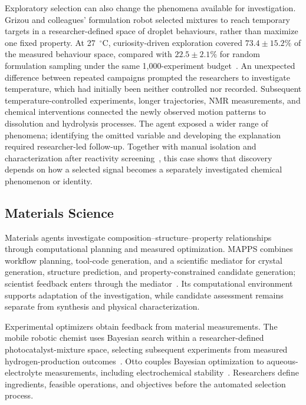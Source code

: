 Exploratory selection can also change the phenomena available for investigation. Grizou and colleagues' formulation robot selected mixtures to reach temporary targets in a researcher-defined space of droplet behaviours, rather than maximize one fixed property. At 27~$^\circ$C, curiosity-driven exploration covered $73.4\pm15.2\%$ of the measured behaviour space, compared with $22.5\pm2.1\%$ for random formulation sampling under the same 1,000-experiment budget~\cite{asd0575}. An unexpected difference between repeated campaigns prompted the researchers to investigate temperature, which had initially been neither controlled nor recorded. Subsequent temperature-controlled experiments, longer trajectories, NMR measurements, and chemical interventions connected the newly observed motion patterns to dissolution and hydrolysis processes. The agent exposed a wider range of phenomena; identifying the omitted variable and developing the explanation required researcher-led follow-up. Together with manual isolation and characterization after reactivity screening~\cite{asd0734}, this case shows that discovery depends on how a selected signal becomes a separately investigated chemical phenomenon or identity.

\subsection{Materials Science}

Materials agents investigate composition--structure--property relationships through computational planning and measured optimization. MAPPS combines workflow planning, tool-code generation, and a scientific mediator for crystal generation, structure prediction, and property-constrained candidate generation; scientist feedback enters through the mediator~\cite{asd0001}. Its computational environment supports adaptation of the investigation, while candidate assessment remains separate from synthesis and physical characterization.

Experimental optimizers obtain feedback from material measurements. The mobile robotic chemist uses Bayesian search within a researcher-defined photocatalyst-mixture space, selecting subsequent experiments from measured hydrogen-production outcomes~\cite{burger2020}. Otto couples Bayesian optimization to aqueous-electrolyte measurements, including electrochemical stability~\cite{asd0487}. Researchers define ingredients, feasible operations, and objectives before the automated selection process.


